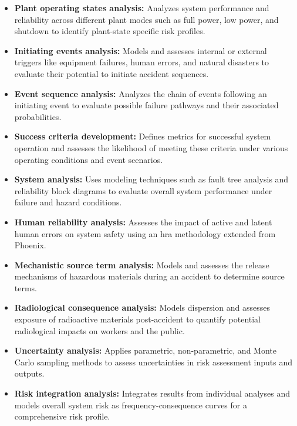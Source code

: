 \begin{itemize}
  \item \textbf{Plant operating states analysis:} Analyzes system performance and reliability across different plant modes such as full power, low power, and shutdown to identify plant-state specific risk profiles.
  \item \textbf{Initiating events analysis:} Models and assesses internal or external triggers like equipment failures, human errors, and natural disasters to evaluate their potential to initiate accident sequences.
  \item \textbf{Event sequence analysis:} Analyzes the chain of events following an initiating event to evaluate possible failure pathways and their associated probabilities.
  \item \textbf{Success criteria development:} Defines metrics for successful system operation and assesses the likelihood of meeting these criteria under various operating conditions and event scenarios.
  \item \textbf{System analysis:} Uses modeling techniques such as fault tree analysis and reliability block diagrams to evaluate overall system performance under failure and hazard conditions.
  \item \textbf{Human reliability analysis:} Assesses the impact of active and latent human errors on system safety using an \acrshort{hra} methodology extended from Phoenix.
  \item \textbf{Mechanistic source term analysis:} Models and assesses the release mechanisms of hazardous materials during an accident to determine source terms.
  \item \textbf{Radiological consequence analysis:} Models dispersion and assesses exposure of radioactive materials post-accident to quantify potential radiological impacts on workers and the public.
  \item \textbf{Uncertainty analysis:} Applies parametric, non-parametric, and Monte Carlo sampling methods to assess uncertainties in risk assessment inputs and outputs.
  \item \textbf{Risk integration analysis:} Integrates results from individual analyses and models overall system risk as frequency-consequence curves for a comprehensive risk profile.
\end{itemize}





